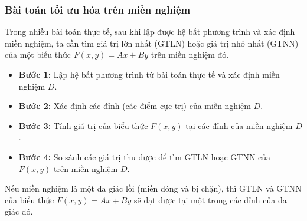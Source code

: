 \subsubsection{Bài toán tối ưu hóa trên miền nghiệm}
\begin{kienthuc}
Trong nhiều bài toán thực tế, sau khi lập được hệ bất phương trình và xác định miền nghiệm, ta cần tìm giá trị lớn nhất (GTLN) hoặc giá trị nhỏ nhất (GTNN) của một biểu thức $F(x, y) = Ax + By$ trên miền nghiệm đó.
\begin{itemize}
    \item \textbf{Bước 1:} Lập hệ bất phương trình từ bài toán thực tế và xác định miền nghiệm $D$.
    \item \textbf{Bước 2:} Xác định các đỉnh (các điểm cực trị) của miền nghiệm $D$.
    \item \textbf{Bước 3:} Tính giá trị của biểu thức $F(x, y)$ tại các đỉnh của miền nghiệm $D$.
    \item \textbf{Bước 4:} So sánh các giá trị thu được để tìm GTLN hoặc GTNN của $F(x, y)$ trên miền nghiệm $D$.
\end{itemize}
 Nếu miền nghiệm là một đa giác lồi (miền đóng và bị chặn), thì GTLN và GTNN của biểu thức $F(x, y) = Ax + By$ sẽ đạt được tại một trong các đỉnh của đa giác đó.
\end{kienthuc}

